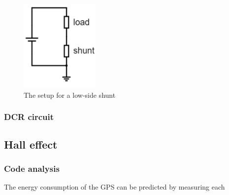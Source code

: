 \begin{figure}[h]
\centering
\includegraphics[height=4.5cm]{Project_Report/Images/shunt.PNG}
\caption{The setup for a low-side shunt}
\label{shunt}
\end{figure}


\subsubsection{DCR circuit}





\subsection{Hall effect}

\subsubsection{Code analysis}

The energy consumption of the GPS can be predicted by measuring each 